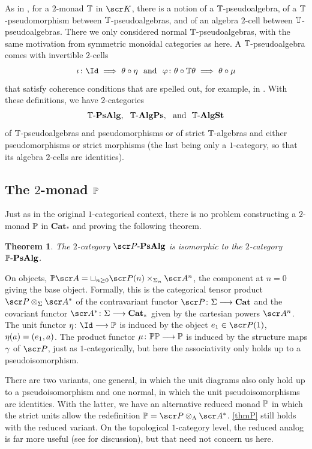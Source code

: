\documentclass{amsart}
\newtheorem{thm}{Theorem}[section]
\theoremstyle{definition}
\numberwithin{equation}{section}
\newcommand{\PPs}{\sP\text{-}\mathbf{PsAlg}}
\begin{document}
As in \cite{GMMO1}, for a $2$-monad $\mathbb{T}$ in $\sK$, there is a notion of a $\mathbb{T}$-pseudoalgebra, of a $\mathbb{T}$-pseudomorphism between $\mathbb{T}$-pseudoalgebras, and of an algebra $2$-cell between $\mathbb{T}$-pseudoalgebras.    There we only considered normal $\mathbb{T}$-pseudoalgebras, with the same motivation from symmetric monoidal categories as here.  A $\mathbb{T}$-pseudoalgebra comes with invertible $2$-cells 
$$\io \colon \Id \implies \tha\com \et \ \ \text{and} \ \ \varphi\colon \tha\com \bT\tha \implies \tha \com \mu$$ 
 that satisfy coherence conditions that are spelled out, for example, in \cite[2.4]{Power}.   With these definitions, we have $2$-categories 
$$ \bT\text{-}\bf{PsAlg}, \ \  \bT\text{-}\bf{AlgPs}, \ \ \text{and} \ \ \bT\text{-}\bf{AlgSt}$$
of $\mathbb{T}$-pseudoalgebras and pseudomorphisms or of strict $\mathbb{T}$-algebras and either pseudomorphisms or strict morphisms (the last being only a $1$-category, so that its algebra $2$-cells are identities). 

\subsection{The $2$-monad $\mathbb{P}$}
Just as in the original $1$-categorical context, there is no problem constructing a $2$-monad $\mathbb{P}$ in $\mathbf{Cat}_*$ and proving the following theorem. 

\begin{thm}\label{thmP} The $2$-category $\PPs$ is isomorphic to the $2$-category $\mathbb{P}\text{-}\bf{PsAlg}$.
\end{thm}

On objects, $\bP\sA = \sqcup_{n\geq 0} \sP(n) \times_{\SI_n} \sA^n$, the component at $n=0$ giving the base object.  Formally, this is the categorical tensor product $\sP\otimes_{\SI} \sA^*$ of the contravariant functor 
$\sP\colon \SI \rtarr \mathbf{Cat}$ and the covariant functor $\sA^*\colon \SI \rtarr \mathbf{Cat}_*$ given by the cartesian powers $\sA^n$.   The unit functor $\et\colon \Id \rtarr \bP$ is induced by the object $e_1\in \sP(1)$, $\eta(a) = (e_1, a)$.  The product functor $\mu\colon \mathbb{P}\mathbb{P} \longrightarrow \mathbb{P}$ is induced by the structure maps $\gamma$ of $\sP$, just as $1$-categorically, but here the associativity only holds up to a pseudoisomorphism.  

There are two variants, one general, in which the unit diagrams also only hold up to a pseudoisomorphism and one normal, in which the unit pseudoisomorphisms are identities.    With the latter, we have an alternative reduced monad $\mathbb{P}$ in which the strict units allow the redefinition $\bP = \sP\otimes_{\LA} \sA^*$.  \autoref{thmP} still holds with the reduced variant.  On the topological $1$-category level, the reduced analog is far more useful (see \cite[section 4]{Rant1} for discussion), but that need not concern us here.
\end{document}
